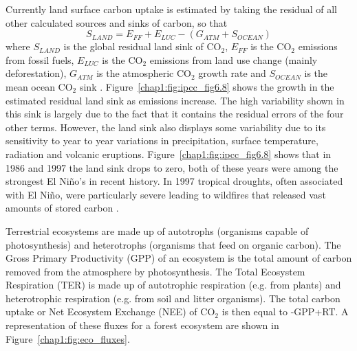 Currently land surface carbon uptake is estimated by taking the residual of all other calculated sources and sinks of carbon, so that
\begin{equation}
S_{LAND} = E_{FF} + E_{LUC} - (G_{ATM} + S_{OCEAN})
\end{equation}  
where \(S_{LAND}\) is the global residual land sink of CO\(_{2}\), \(E_{FF}\) is the CO\(_{2}\) emissions from fossil fuels, \(E_{LUC}\) is the CO\(_{2}\) emissions from land use change (mainly deforestation), \(G_{ATM}\) is the atmospheric CO\(_{2}\) growth rate and \(S_{OCEAN}\) is the mean ocean CO\(_{2}\) sink \citep{le2015global}. Figure~\ref{chap1:fig:ipcc_fig6.8} shows the growth in the estimated residual land sink as emissions increase. The high variability shown in this sink is largely due to the fact that it contains the residual errors of the four other terms. However, the land sink also displays some variability due to its sensitivity to year to year variations in precipitation, surface temperature, radiation and volcanic eruptions. Figure~\ref{chap1:fig:ipcc_fig6.8} shows that in 1986 and 1997 the land sink drops to zero, both of these years were among the strongest El Ni\~no's in recent history. In 1997 tropical droughts, often associated with El Ni\~no, were particularly severe leading to wildfires that released vast amounts of stored carbon \citep{schimel2013climate}.

Terrestrial ecosystems are made up of autotrophs (organisms capable of photosynthesis) and heterotrophs (organisms that feed on organic carbon). The Gross Primary Productivity (GPP) of an ecosystem is the total amount of carbon removed from the atmosphere by photosynthesis. The Total Ecosystem Respiration (TER) is made up of autotrophic respiration (e.g. from plants) and heterotrophic respiration (e.g. from soil and litter organisms). The total carbon uptake or Net Ecosystem Exchange (NEE) of CO\(_2\) is then equal to -GPP+RT. A representation of these fluxes for a forest ecosystem are shown in Figure~\ref{chap1:fig:eco_fluxes}. 

